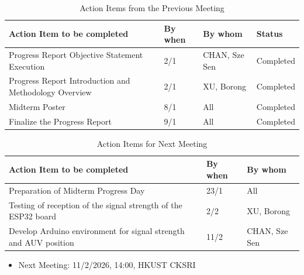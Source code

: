 \documentclass[11pt]{article}
\begin{document}
    \begin{longtable}[c]{|l|l|l|l|}
        \caption{Action Items from the Previous Meeting}\\
        \hline
        \textbf{Action Item to be completed} & \textbf{By when} & \textbf{By whom} & \textbf{Status} \\
        \hline
        \endhead
        Progress Report Objective Statement Execution & 2/1 & CHAN, Sze Sen & Completed \\
        \hline
        Progress Report Introduction and Methodology Overview  & 2/1 & XU, Borong & Completed \\
        \hline
        Midterm Poster & 8/1 & All & Completed \\
        \hline
        Finalize the Progress Report & 9/1 & All & Completed \\
        \hline
    \end{longtable}
    \begin{longtable}[c]{|l|l|l|}
        \caption{Action Items for Next Meeting}\\
        \hline
        \textbf{Action Item to be completed} & \textbf{By when} & \textbf{By whom} \\
        \hline
        \endhead
        Preparation of Midterm Progress Day & 23/1 & All \\
        \hline
        Testing of reception of the signal strength of the ESP32 board & 2/2 & XU, Borong \\
        \hline
        Develop Arduino environment for signal strength and AUV position & 11/2 & CHAN, Sze Sen \\
        \hline
    \end{longtable}
    \begin{itemize}
    \item Next Meeting: 11/2/2026, 14:00, HKUST CKSRI
    \end{itemize}
    \newpage
\end{document}
